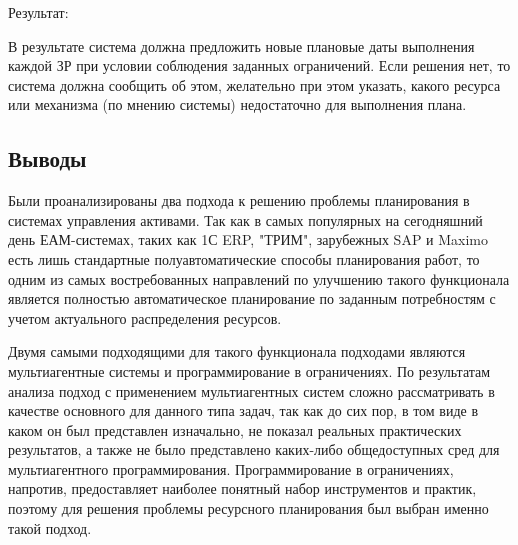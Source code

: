 	Результат:
	
	В результате система должна предложить новые плановые даты выполнения каждой ЗР при условии соблюдения заданных ограничений. Если решения нет, то система должна сообщить об этом, желательно при этом указать, какого ресурса или механизма (по мнению системы) недостаточно для выполнения плана.
	

\subsection{Выводы}

Были проанализированы два подхода к решению проблемы планирования в системах управления активами. Так как в самых популярных на сегодняшний день ЕАМ-системах, таких как 1С ERP, "ТРИМ", зарубежных SAP и Maximo есть лишь стандартные полуавтоматические способы планирования работ, то одним из самых востребованных направлений по улучшению такого функционала является полностью автоматическое планирование по заданным потребностям с учетом актуального распределения ресурсов.

Двумя самыми подходящими для такого функционала подходами являются мультиагентные системы и программирование в ограничениях. По результатам анализа подход с применением мультиагентных систем сложно рассматривать в качестве основного для данного типа задач, так как до сих пор, в том виде в каком он был представлен изначально, не показал реальных практических результатов, а также не было представлено каких-либо общедоступных сред для мультиагентного программирования. Программирование в ограничениях, напротив, предоставляет наиболее понятный набор инструментов и практик, поэтому для решения проблемы ресурсного планирования был выбран именно такой подход.


\clearpage
